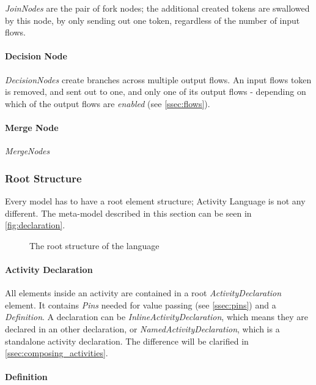 \emph{JoinNodes} are the pair of fork nodes; the additional created tokens are swallowed by this node, by only sending out one token, regardless of the number of input flows.

\paragraph{Decision Node}

\emph{DecisionNodes} create branches across multiple output flows. An input flows token is removed, and sent out to one, and only one of its output flows - depending on which of the output flows are \emph{enabled} (see \autoref{ssec:flows}).

\paragraph{Merge Node}

\emph{MergeNodes} 

\subsubsection{Root Structure}\label{ssec:root_structure}

Every model has to have a root element structure; Activity Language is not any different. The meta-model described in this section can be seen in \autoref{fig:declaration}.

\begin{figure}[!ht]
	\centering
	
	\caption{The root structure of the language}
	\label{fig:declaration}
\end{figure}

\paragraph{Activity Declaration}\label{par:activity_declaration}

All elements inside an activity are contained in a root \emph{ActivityDeclaration} element. It contains \emph{Pins} needed for value passing (see \autoref{ssec:pins}) and a \emph{Definition}. A declaration can be \emph{InlineActivityDeclaration}, which means they are declared in an other declaration, or \emph{NamedActivityDeclaration}, which is a standalone activity declaration. The difference will be clarified in \autoref{ssec:composing_activities}.

\paragraph{Definition}\label{par:definition}

